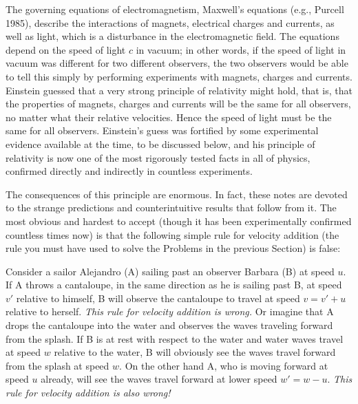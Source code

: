 The governing equations of electromagnetism, Maxwell's equations
(e.g., Purcell 1985), describe the interactions of magnets, electrical
charges and currents, as well as light, which is a disturbance in the
electromagnetic field.  The equations depend on the speed of light $c$
in vacuum; in other words, if the speed of light in vacuum was
different for two different observers, the two observers would be able
to tell this simply by performing experiments with magnets, charges
and currents.  Einstein guessed that a very strong principle of
relativity might hold, that is, that the properties of magnets,
charges and currents will be the same for all observers, no matter
what their relative velocities.  Hence the speed of light must be the
same for all observers.  Einstein's guess was fortified by some
experimental evidence available at the time, to be discussed below,
and his principle of relativity is now one of the most rigorously
tested facts in all of physics, confirmed directly and indirectly in
countless experiments.

The consequences of this principle are enormous.  In fact, these notes
are devoted to the strange predictions and counterintuitive results
that follow from it.  The most obvious and hardest to accept (though
it has been experimentally confirmed countless times now) is that the
following simple rule for velocity addition (the rule you must have
used to solve the Problems in the previous Section) is false:

Consider a sailor Alejandro (A) sailing past an observer Barbara (B)
at speed $u$.  If A throws a cantaloupe, in the same direction as he
is sailing past B, at speed $v'$ relative to himself, B will observe
the cantaloupe to travel at speed $v=v'+u$ relative to herself.  {\em
This rule for velocity addition is wrong.} Or imagine that A drops
the cantaloupe into the water and observes the waves traveling forward
from the splash.  If B is at rest with respect to the water and water
waves travel at speed $w$ relative to the water, B will obviously see
the waves travel forward from the splash at speed $w$.  On the other
hand A, who is moving forward at speed $u$ already, will see the waves
travel forward at lower speed $w'=w-u$.  {\em This rule for velocity
addition is also wrong!}

